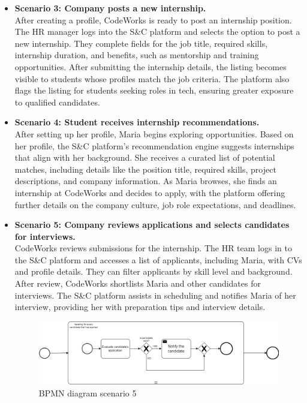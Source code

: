 \begin{itemize}
    \item \textbf{Scenario 3: Company posts a new internship.} \\
    After creating a profile, CodeWorks is ready to post an internship position. The HR manager logs into the S\&C platform and selects the option to post a new internship. They complete fields for the job title, required skills, internship duration, and benefits, such as mentorship and training opportunities. After submitting the internship details, the listing becomes visible to students whose profiles match the job criteria. The platform also flags the listing for students seeking roles in tech, ensuring greater exposure to qualified candidates. 

    \item \textbf{Scenario 4: Student receives internship recommendations.}  \\
    After setting up her profile, Maria begins exploring opportunities. Based on her profile, the S\&C platform’s recommendation engine suggests internships that align with her background. She receives a curated list of potential matches, including details like the position title, required skills, project descriptions, and company information. As Maria browses, she finds an internship at CodeWorks and decides to apply, with the platform offering further details on the company culture, job role expectations, and deadlines.
    
    \item \textbf{Scenario 5: Company reviews applications and selects candidates for interviews.} \\ 
    CodeWorks reviews submissions for the internship. The HR team logs in to the S\&C platform and accesses a list of applicants, including Maria, with CVs and profile details. They can filter applicants by skill level and background. After review, CodeWorks shortlists Maria and other candidates for interviews. The S\&C platform assists in scheduling and notifies Maria of her interview, providing her with preparation tips and interview details.

    \begin{figure}[!ht]
    \centering
    \includegraphics[scale=0.30]{Images/ImagesRASD/scenario_5.png}
    \caption{BPMN diagram scenario 5}
    \end{figure}


\end{itemize}
